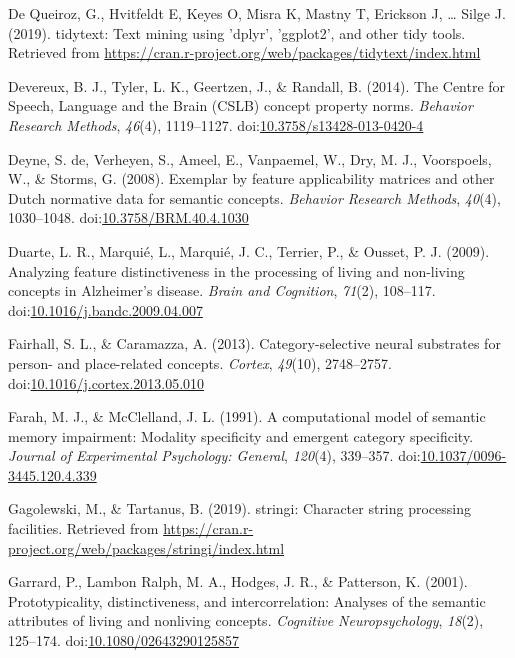 \documentclass[man]{apa6}
\begin{document}
\leavevmode\hypertarget{ref-DeQueiroz2019}{}%
De Queiroz, G., Hvitfeldt E, Keyes O, Misra K, Mastny T, Erickson J, \ldots{} Silge J. (2019). tidytext: Text mining using 'dplyr', 'ggplot2', and other tidy tools. Retrieved from \url{https://cran.r-project.org/web/packages/tidytext/index.html}

\leavevmode\hypertarget{ref-Devereux2014}{}%
Devereux, B. J., Tyler, L. K., Geertzen, J., \& Randall, B. (2014). The Centre for Speech, Language and the Brain (CSLB) concept property norms. \emph{Behavior Research Methods}, \emph{46}(4), 1119--1127. doi:\href{https://doi.org/10.3758/s13428-013-0420-4}{10.3758/s13428-013-0420-4}

\leavevmode\hypertarget{ref-DeDeyne2008d}{}%
Deyne, S. de, Verheyen, S., Ameel, E., Vanpaemel, W., Dry, M. J., Voorspoels, W., \& Storms, G. (2008). Exemplar by feature applicability matrices and other Dutch normative data for semantic concepts. \emph{Behavior Research Methods}, \emph{40}(4), 1030--1048. doi:\href{https://doi.org/10.3758/BRM.40.4.1030}{10.3758/BRM.40.4.1030}

\leavevmode\hypertarget{ref-Duarte2009}{}%
Duarte, L. R., Marquié, L., Marquié, J. C., Terrier, P., \& Ousset, P. J. (2009). Analyzing feature distinctiveness in the processing of living and non-living concepts in Alzheimer's disease. \emph{Brain and Cognition}, \emph{71}(2), 108--117. doi:\href{https://doi.org/10.1016/j.bandc.2009.04.007}{10.1016/j.bandc.2009.04.007}

\leavevmode\hypertarget{ref-Fairhall2013}{}%
Fairhall, S. L., \& Caramazza, A. (2013). Category-selective neural substrates for person- and place-related concepts. \emph{Cortex}, \emph{49}(10), 2748--2757. doi:\href{https://doi.org/10.1016/j.cortex.2013.05.010}{10.1016/j.cortex.2013.05.010}

\leavevmode\hypertarget{ref-Farah1991}{}%
Farah, M. J., \& McClelland, J. L. (1991). A computational model of semantic memory impairment: Modality specificity and emergent category specificity. \emph{Journal of Experimental Psychology: General}, \emph{120}(4), 339--357. doi:\href{https://doi.org/10.1037/0096-3445.120.4.339}{10.1037/0096-3445.120.4.339}

\leavevmode\hypertarget{ref-Gagolewski2019}{}%
Gagolewski, M., \& Tartanus, B. (2019). stringi: Character string processing facilities. Retrieved from \url{https://cran.r-project.org/web/packages/stringi/index.html}

\leavevmode\hypertarget{ref-Garrard2001}{}%
Garrard, P., Lambon Ralph, M. A., Hodges, J. R., \& Patterson, K. (2001). Prototypicality, distinctiveness, and intercorrelation: Analyses of the semantic attributes of living and nonliving concepts. \emph{Cognitive Neuropsychology}, \emph{18}(2), 125--174. doi:\href{https://doi.org/10.1080/02643290125857}{10.1080/02643290125857}
\end{document}
